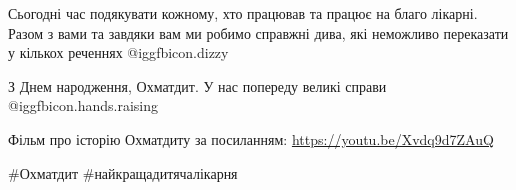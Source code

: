 
Сьогодні час подякувати кожному, хто працював та працює на благо лікарні. Разом
з вами та завдяки вам ми робимо справжні дива, які неможливо переказати у
кількох реченнях  @igg{fbicon.dizzy} 


З Днем народження, Охматдит. У нас попереду великі справи  @igg{fbicon.hands.raising} 

Фільм про історію Охматдиту за посиланням: \url{https://youtu.be/Xvdq9d7ZAuQ}

\#Охматдит \#найкращадитячалікарня

